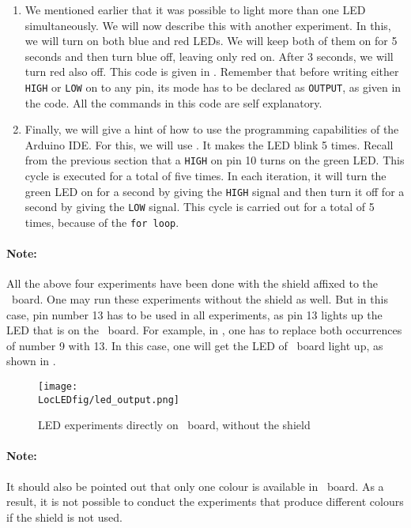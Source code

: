 \begin{enumerate}
\item We mentioned earlier that it was possible to light more than one
  LED simultaneously.  We will now describe this with another
  experiment.  In this, we will turn on both blue and red LEDs.  We
  will keep both of them on for 5 seconds and then turn blue off,
  leaving only red on.  After 3 seconds, we will turn red also off.
  This code is given in .  Remember that
  before writing either {\tt HIGH} or {\tt LOW} on to any pin, its
  mode has to be declared as {\tt OUTPUT}, as given in the code.  All
  the commands in this code are self explanatory.

\item Finally, we will give a hint of how to use the programming
  capabilities of the Arduino IDE.  For this, we will use
  .  It makes the LED blink 5 times.  Recall
  from the previous section that a {\tt HIGH} on pin 10 turns on the
  green LED.  This cycle is executed for a total of five times.  In each
  iteration, it will turn the green LED on for a second by giving the
  {\tt HIGH} signal and then turn it off for a second by giving the
  {\tt LOW} signal.  This cycle is carried out for a total of 5 times,
  because of the {\tt for loop}.
\end{enumerate}

\paragraph{Note:}
All the above four experiments have been done with
the shield affixed to the \arduino\ board.  One may run these
experiments without the shield as well.  But in this case, pin number
13 has to be used in all experiments, as pin 13 lights up the LED that
is on the \arduino\ board.  For example, in , one
has to replace both occurrences of number 9 with 13.  In this case,
one will get the LED of \arduino\ board light up, as shown in
.
\begin{figure}
\centering
\texttt{[image: \\LocLEDfig/led\_output.png]}
\caption{LED experiments directly on \arduino\ board, without the
  shield}
\label{fig:led-uno}
\end{figure}


\paragraph{Note:} It should also be pointed out that only one colour
is available in \arduino\ board.  As a result, it is not possible to
conduct the experiments that produce different colours if the
shield is not used.

